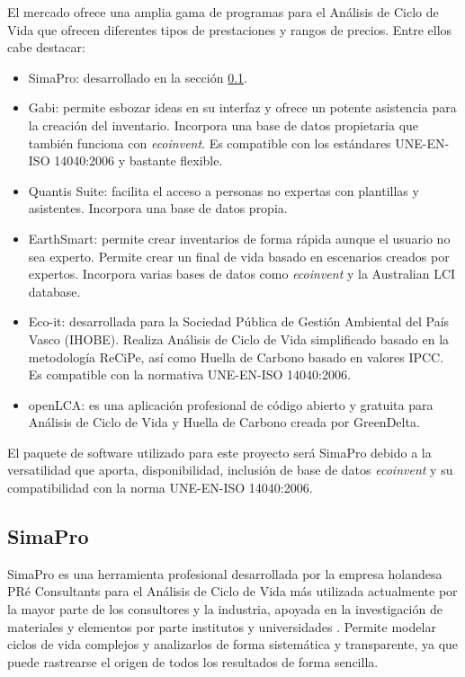 El mercado ofrece una amplia gama de programas para el Análisis de Ciclo de Vida que ofrecen diferentes tipos de prestaciones y rangos de precios. Entre ellos cabe destacar:

\begin{itemize}
  \item SimaPro: desarrollado en la sección \ref{sec:simapro}.
  \item Gabi: permite esbozar ideas en su interfaz y ofrece un potente asistencia para la creación del inventario. Incorpora una base de datos propietaria que también funciona con \textit{ecoinvent}. Es compatible con los estándares UNE-EN-ISO 14040:2006 y bastante flexible.
  \item Quantis Suite: facilita el acceso a personas no expertas con plantillas y asistentes. Incorpora una base de datos propia.
  \item EarthSmart: permite crear inventarios de forma rápida aunque el usuario no sea experto. Permite crear un final de vida basado en escenarios creados por expertos. Incorpora varias bases de datos como \textit{ecoinvent} y la Australian LCI database.
  \item Eco-it: desarrollada para la Sociedad Pública de Gestión Ambiental del País Vasco (IHOBE). Realiza Análisis de Ciclo de Vida simplificado basado en la metodología ReCiPe, así como Huella de Carbono basado en valores IPCC. Es compatible con la normativa UNE-EN-ISO 14040:2006.
  \item openLCA: es una aplicación profesional de código abierto y gratuita para Análisis de Ciclo de Vida y Huella de Carbono creada por GreenDelta.
\end{itemize}

El paquete de software utilizado para este proyecto será SimaPro debido a la versatilidad que aporta, disponibilidad, inclusión de base de datos \textit{ecoinvent} y su compatibilidad con la norma UNE-EN-ISO 14040:2006.

\subsection{SimaPro}\label{sec:simapro}
SimaPro es una herramienta profesional desarrollada por la empresa holandesa PRé Consultants para el Análisis de Ciclo de Vida más utilizada actualmente por la mayor parte de los consultores y la industria, apoyada en la investigación de materiales y elementos por parte institutos y universidades \cite{mgoedkoop}. Permite modelar ciclos de vida complejos y analizarlos de forma sistemática y transparente, ya que puede rastrearse el origen de todos los resultados de forma sencilla.

